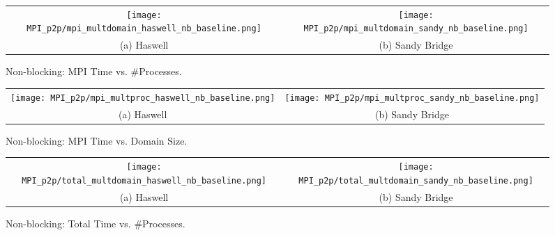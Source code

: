 \begin{enumerate}
	\begin{figure}[p] %
		\begin{tabular}{cc}
			\hspace*{-0.35\linewidth}\texttt{[image: MPI\_p2p/mpi\_multdomain\_haswell\_nb\_baseline.png]} & \hspace*{-0.05\linewidth}\texttt{[image: MPI\_p2p/mpi\_multdomain\_sandy\_nb\_baseline.png]} \\
			\hspace*{-0.45\linewidth}(a) Haswell & \hspace*{-0.15\linewidth}(b) Sandy Bridge\\[6pt]
		\end{tabular}
		\caption{Non-blocking: MPI Time vs. \#Processes.}
		\label{fig:mpi_multdomain_nb_baseline}
	\end{figure}
	
	\begin{figure}[p] %
		\begin{tabular}{cc}
			\hspace*{-0.35\linewidth}\texttt{[image: MPI\_p2p/mpi\_multproc\_haswell\_nb\_baseline.png]} & \hspace*{-0.05\linewidth}\texttt{[image: MPI\_p2p/mpi\_multproc\_sandy\_nb\_baseline.png]} \\
			\hspace*{-0.45\linewidth}(a) Haswell & \hspace*{-0.15\linewidth}(b) Sandy Bridge\\[6pt]
		\end{tabular}
		\caption{Non-blocking: MPI Time vs. Domain Size.}
		\label{fig:mpi_multproc_nb_baseline}
	\end{figure}
	
	\begin{figure}[p] %
		\begin{tabular}{cc}
			\hspace*{-0.35\linewidth}\texttt{[image: MPI\_p2p/total\_multdomain\_haswell\_nb\_baseline.png]} & \hspace*{-0.05\linewidth}\texttt{[image: MPI\_p2p/total\_multdomain\_sandy\_nb\_baseline.png]} \\
			\hspace*{-0.45\linewidth}(a) Haswell & \hspace*{-0.15\linewidth}(b) Sandy Bridge\\[6pt]
		\end{tabular}
		\caption{Non-blocking: Total Time vs. \#Processes.}
		\label{fig:total_multdomain_nb_baseline}
	\end{figure}
	

\end{enumerate}
